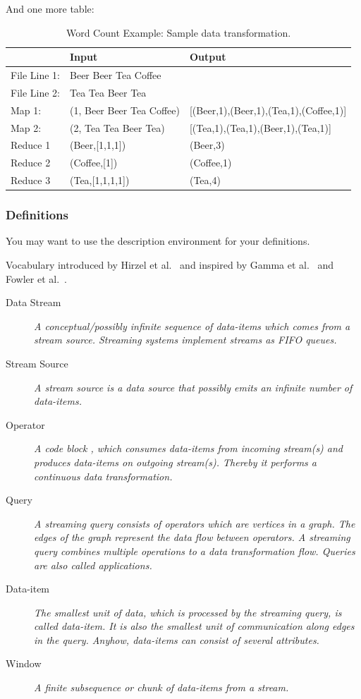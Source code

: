 And one more table:

\begin{table}[h!]
  \centering
  \begin{tabular}{lll}
	\toprule    
    \hline
    & \textbf{Input} & \textbf{Output}\\
    \midrule
    File Line 1:& Beer Beer Tea Coffee &\\
    File Line 2:& Tea Tea Beer Tea &\\
	\hline
	Map 1: & (1, Beer Beer Tea Coffee) & [(Beer,1),(Beer,1),(Tea,1),(Coffee,1)]\\
    Map 2: & (2, Tea Tea Beer Tea)     & [(Tea,1),(Tea,1),(Beer,1),(Tea,1)]\\
    \hline
    Reduce 1 & (Beer,[1,1,1])  & (Beer,3)\\  
	Reduce 2 & (Coffee,[1])    & (Coffee,1)\\
	Reduce 3 & (Tea,[1,1,1,1]) & (Tea,4)\\
    \hline    
    \bottomrule
  \end{tabular}
  \caption{Word Count Example: Sample data transformation.}
  \label{table:wcDataTransformation}
\end{table}

\subsubsection{Definitions}

You may want to use the description environment for your definitions.

Vocabulary introduced by Hirzel et al.~\cite{hirzel2014catalog} and inspired by Gamma et al.~\cite{gamma1995} and Fowler et al.~\cite{fowler1999}.

\begin{description}
	\item[Data Stream] \textit{A conceptual/possibly infinite sequence of data-items which comes from a stream source. Streaming systems implement streams as \ac{FIFO} queues.}
	\item[Stream Source] \textit{A stream source is a data source that possibly emits an infinite number of data-items.}
	\item[Operator] \textit{A code block , which consumes data-items from incoming stream(s) and produces data-items on outgoing stream(s). Thereby it performs a continuous data transformation.}
	\item[Query] \textit{A streaming query consists of operators which are vertices in a graph. The edges of the graph represent the data flow between operators. A streaming query combines multiple operations to a data transformation flow. Queries are also called \textit{applications}.}
	\item[Data-item] \textit{The smallest unit of data, which is processed by the streaming query, is called \emph{data-item}. It is also the smallest unit of communication along edges in the query. Anyhow, data-items can consist of several attributes.}
	\item[Window] \textit{A finite subsequence or chunk of data-items from a stream.}
\end{description}

